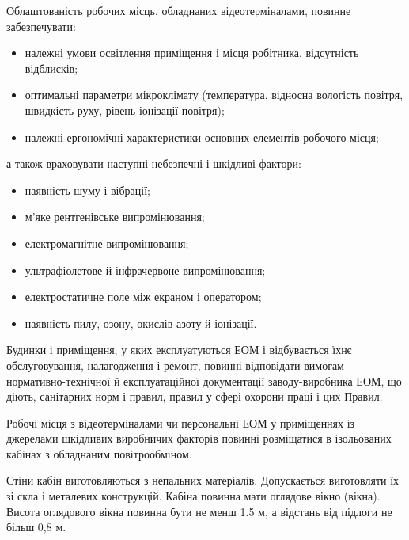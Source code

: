 \documentclass[simple,a4paper,14pt,ukrainian,utf8]{eskdtext}
\begin{document}
\begin{appendices}
                Облаштованість робочих місць, обладнаних відеотерміналами, повинне забезпечувати:

                \begin{itemize}
                    \item належні умови освітлення приміщення і місця робітника, відсутність відблисків;
                    \item оптимальні параметри мікроклімату (температура, відносна вологість повітря, швидкість руху, рівень іонізації повітря);
                    \item належні ергономічні характеристики основних елементів робочого місця;
                \end{itemize}

                а також враховувати наступні небезпечні і шкідливі фактори:

                \begin{itemize}
                    \item наявність шуму і вібрації;
                    \item м'яке рентгенівське випромінювання;
                    \item електромагнітне випромінювання;
                    \item ультрафіолетове й інфрачервоне випромінювання;
                    \item електростатичне поле між екраном і оператором;
                    \item наявність пилу, озону, окислів азоту й іонізації.
                \end{itemize}

                Будинки і приміщення, у яких експлуатуються ЕОМ і відбувається їхнє обслуговування, налагодження і ремонт, повинні відповідати вимогам нормативно-технічної й експлуатаційної документації заводу-виробника ЕОМ, що діють, санітарних норм і правил, правил у сфері охорони праці і цих Правил.

                Робочі місця з відеотерміналами чи персональні ЕОМ у приміщеннях із джерелами шкідливих виробничих факторів повинні розміщатися в ізольованих кабінах з обладнаним повітрообміном.


                Стіни кабін виготовляються з непальних матеріалів. Допускається виготовляти їх зі скла і металевих конструкцій. Кабіна повинна мати оглядове вікно (вікна). Висота оглядового вікна повинна бути не менш 1.5 м, а відстань від підлоги не більш 0,8 м.


\end{appendices}
\end{document}
